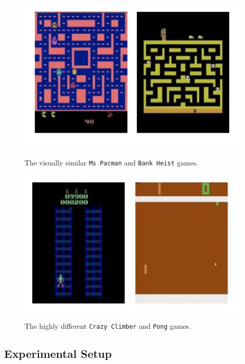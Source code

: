 \begin{figure}[ht]
\centering
\begin{minipage}[b]{0.45\linewidth}
\centering
\includegraphics[width=\textwidth]{./Images/Chapter08/similar_sources}
\caption{The visually similar \texttt{Ms Pacman} and \texttt{Bank Heist} games.}
\label{fig:similar_games}
\end{minipage}
\hspace{0.5cm}
\begin{minipage}[b]{0.45\linewidth}
\centering
\includegraphics[width=\textwidth]{./Images/Chapter08/dissimilar_sources}
\caption{The highly different \texttt{Crazy Climber} and \texttt{Pong} games.}
\label{fig:dissimilar_games}
\end{minipage}
\end{figure}


\subsection{Experimental Setup}
\label{sec:experimental_setup_1}

